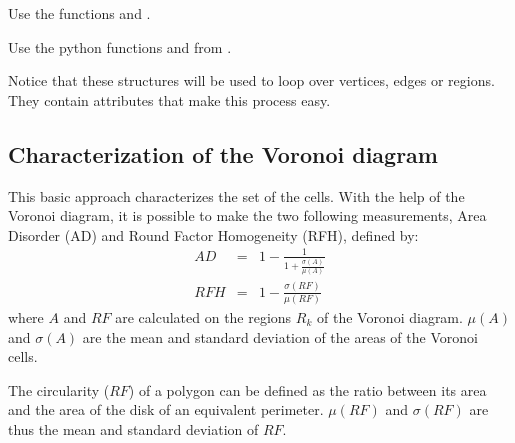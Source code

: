 \begin{mcomment}
\begin{mremark} Use the \matlabregistered{} functions  and .
\end{mremark}
\end{mcomment}

\begin{pcomment}
\begin{premark}
 Use the python functions  and  from .
\end{premark}
\end{pcomment}

\begin{note}
 Notice that these structures will be used to loop over vertices, edges or regions. They contain attributes that make this process easy.
\end{note}


\subsection{Characterization of the Voronoi diagram}
This basic approach characterizes the set of the cells. With the help of the Voronoi diagram, it is possible to make the two following measurements,
Area Disorder (AD) and Round Factor Homogeneity (RFH), defined by:
	\begin{eqnarray}
	AD&=&1-\frac{1}{1+\displaystyle\frac{\sigma(A)}{\mu(A)}}\\
	RFH&=&1-\frac{\sigma(RF)}{\mu(RF)}
	\end{eqnarray}
	where $A$ and $RF$ are calculated on the regions $R_k$ of the Voronoi diagram.  $\mu(A)$ and $\sigma(A)$ are the mean and standard 
deviation of the areas of the Voronoi cells. 

The circularity ($RF$) of a polygon can be defined as the ratio between its area and the area of the disk of an equivalent perimeter. $\mu(RF)$ and $\sigma(RF)$ are thus the mean and standard deviation of $RF$.


